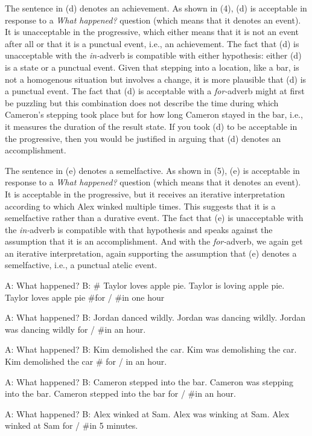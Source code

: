 \documentclass[a4,11pt]{article}
\def\infelic{{\leavevmode\llap{\#}}}
\newcommand{\6}{\mbox{$[\hspace*{-.6mm}[$}}
\newcommand{\9}{\mbox{$]\hspace*{-.6mm}]$}}
\begin{document}
\begin{enumerate}[leftmargin = 12pt]
The sentence in (d) denotes an achievement. As shown in (4), (d) is acceptable in response to a {\em What happened?} question (which means that it denotes an event). It is unacceptable in the progressive, which either means that it is not an event after all or that it is a punctual event, i.e., an achievement. The fact that (d) is unacceptable with the {\em in-}adverb is compatible with either hypothesis: either (d) is a state or a punctual event. Given that stepping into a location, like a bar, is not a homogenous situation but involves a change, it is more plausible that (d) is a punctual event. The fact that (d) is acceptable with a {\em for-}adverb might at first be puzzling but this combination does not describe the time during which Cameron's stepping took place but for how long Cameron stayed in the bar, i.e., it measures the duration of the result state. If you took (d) to be acceptable in the progressive, then you would be justified in arguing that (d) denotes an accomplishment.

The sentence in (e) denotes a semelfactive. As shown in (5), (e) is acceptable in response to a {\em What happened?} question (which means that it denotes an event). It is acceptable in the progressive, but it receives an iterative interpretation according to which Alex winked multiple times. This suggests that it is a semelfactive rather than a durative event. The fact that (e) is unacceptable with the {\em in-}adverb is compatible with that hypothesis and speaks against the assumption that it is an accomplishment. And with the {\em for-}adverb, we again get an iterative interpretation, again supporting the assumption that (e) denotes a semelfactive, i.e., a punctual atelic event.

\begin{exe}
\ex
\begin{xlist}
\ex A: What happened?  B: \# Taylor loves apple pie.
\ex \infelic Taylor is loving apple pie.
\ex Taylor loves apple pie \#for / \#in one hour
\end{xlist}
\ex 
\begin{xlist}
\ex A: What happened?  B: Jordan danced wildly.
\ex Jordan was dancing wildly.
\ex Jordan was dancing wildly for / \#in an hour.
\end{xlist}
\ex
\begin{xlist}
\ex A: What happened?  B: Kim demolished the car.
\ex Kim was demolishing the car.
\ex Kim demolished the car \# for / in an hour.
\end{xlist}
\ex
\begin{xlist}
\ex A: What happened?  B: Cameron stepped into the bar.
\ex \infelic Cameron was stepping into the bar.
\ex Cameron stepped into the bar for / \#in an hour. 
\end{xlist}
\ex
\begin{xlist}
\ex A: What happened?  B: Alex winked at Sam.
\ex Alex was winking at Sam.
\ex Alex winked at Sam for / \#in 5 minutes.
\end{xlist}
\end{exe}


\end{enumerate}
\end{document}
